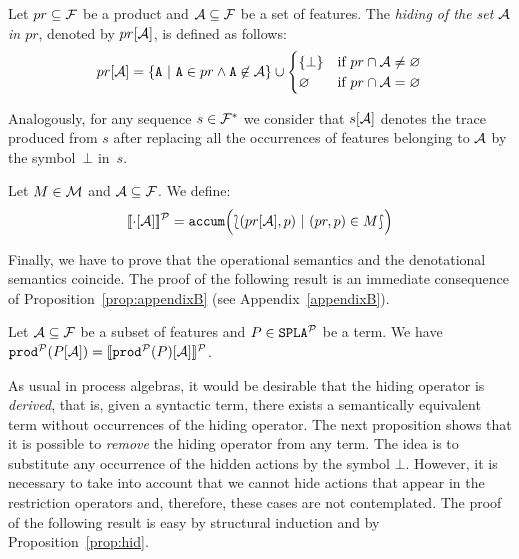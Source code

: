 \bdfn
  Let $pr\subseteq{\cal F}$ be a product and ${\cal A}\subseteq{\cal F}$
  be a set of features. The \emph{hiding of the set ${\cal A}$
    in $pr$}, denoted by $pr[{\cal A}]$, is defined as follows:
  \begin{displaymath}
    pr\hide{\calA} = \{\fA\ |\ \fA\in pr\wedge
    \fA\not\in\calA\}\cup
    \begin{cases}
      \{\bot\} & \mbox{if } pr\cap\calA\neq\emptyset\\
      \emptyset & \mbox{if } pr\cap\calA=\emptyset\\
    \end{cases}
  \end{displaymath}

  Analogously, for any sequence $s\in{\cal F}^{*}$ we consider that $s[{\cal A}]$ denotes the
  trace produced from $s$ after replacing all the occurrences of features belonging to ${\cal A}$ by the symbol~$\bot$ in~$s$.
\edfn

\bdfn
  Let $M\in{\cal M}$ and ${\cal A}\subseteq{\cal F}$. We define:
  \begin{displaymath}
    [\![\cdot[{\cal A}]]\!]^{\cal P} = \mathtt{accum}\Bigl(\lbag(pr[{\cal A}],p)\
    |\ (pr,p)\in M\rbag \Bigr)
  \end{displaymath}
\edfn

Finally, we have to prove that the
operational semantics and the denotational semantics coincide.
%
The proof of the following result is an immediate consequence of Proposition~\ref{prop:appendixB} (see Appendix~\ref{appendixB}).

\bprop\label{prop:hid}Let ${\cal A}\subseteq {\cal F}$ be a subset of features and
  $P\in\mathtt{SPLA{^{\cal P}}}$ be a term. We have $ \mathtt{prod}^{\cal P}(P[{\cal A}])  = [\![\mathtt{prod}^{\cal P}(P)[{\cal A}]]\!]^{\cal P}$.
\eprop

As usual in process algebras, it would be desirable that the hiding operator is \emph{derived}, that is, given a syntactic term, there exists a semantically equivalent term without occurrences of the hiding operator.
The next proposition shows that  it is possible to \emph{remove} the hiding
operator from any term. The idea is to substitute any occurrence of
the hidden actions by the symbol $\bot$. However, it is necessary to take into account  that we cannot
hide actions that appear in the restriction operators and, therefore, these cases are not contemplated. The proof of the following result is easy by structural induction and by Proposition~\ref{prop:hid}.

